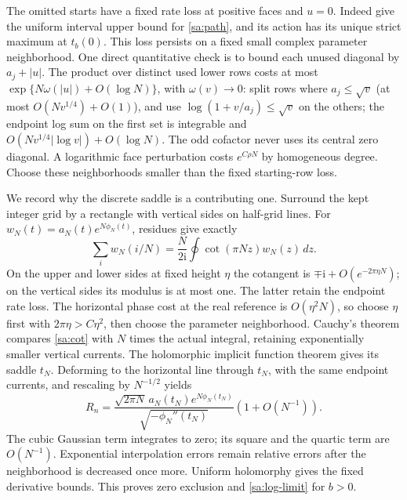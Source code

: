 \documentclass[11pt]{article}
\numberwithin{equation}{section}
\theoremstyle{definition}\newtheorem{definition}[theorem]{Definition}
\theoremstyle{remark}\newtheorem{remark}[theorem]{Remark}
\newcommand{\ii}{\mathrm i}
\begin{document}
The omitted starts have a fixed rate loss at positive faces and $u=0$.
Indeed \cite[Lemmas 4.1 and 5.2]{Local} give the uniform interval
upper bound for \eqref{sa:path}, and its action has its unique strict
maximum at $t_b(0)$. This loss persists on a fixed small complex
parameter neighborhood. One direct quantitative check is to bound
each unused diagonal by $a_j+|u|$. The product over distinct used
lower rows costs at most $\exp\{N\omega(|u|)+O(\log N)\}$, with
$\omega(v)\to0$: split rows where $a_j\le\sqrt v$ (at most
$O(Nv^{1/4})+O(1)$), and use $\log(1+v/a_j)\le\sqrt v$ on the
others; the endpoint log sum on the first set is integrable and
$O(Nv^{1/4}|\log v|)+O(\log N)$.
The odd cofactor never uses its central zero diagonal. A logarithmic
face perturbation costs $e^{C\rho N}$ by homogeneous degree. Choose
these neighborhoods smaller than the fixed starting-row loss.

We record why the discrete saddle is a contributing one. Surround the
kept integer grid by a rectangle with vertical sides on half-grid
lines. For $w_N(t)=a_N(t)e^{N\phi_N(t)}$, residues give exactly
\begin{equation}\label{sa:cot}
 \sum_iw_N(i/N)=\frac{N}{2\ii}\oint\cot(\pi Nz)w_N(z)\,dz.
\end{equation}
On the upper and lower sides at fixed height $\eta$ the cotangent is
$\mp\ii+O(e^{-2\pi\eta N})$; on the vertical sides its modulus is
at most one. The latter retain the endpoint rate loss. The horizontal
phase cost at the real reference is $O(\eta^2N)$, so choose $\eta$
first with $2\pi\eta>C\eta^2$, then choose the parameter neighborhood.
Cauchy's theorem compares \eqref{sa:cot} with $N$ times the actual
integral, retaining exponentially smaller vertical currents.
The holomorphic implicit function theorem gives its saddle $t_N$.
Deforming to the horizontal line through $t_N$, with the same
endpoint currents, and rescaling by $N^{-1/2}$ yields
\begin{equation}\label{sa:interior-packet}
 R_n=\frac{\sqrt{2\pi N}\,a_N(t_N)e^{N\phi_N(t_N)}}
                  {\sqrt{-\phi_N''(t_N)}}(1+O(N^{-1})).
\end{equation}
The cubic Gaussian term integrates to zero; its square and the
quartic term are $O(N^{-1})$. Exponential interpolation errors remain
relative errors after the neighborhood is decreased once more.
Uniform holomorphy gives the fixed derivative bounds. This proves
zero exclusion and \eqref{sa:log-limit} for $b>0$.
\end{document}

